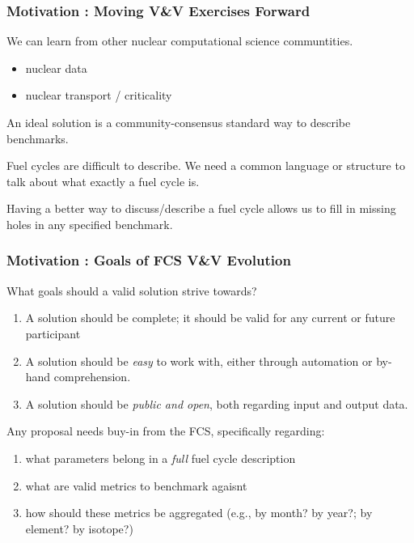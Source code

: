 \begin{frame}[ctb!]
  \frametitle{Motivation : Moving V\&V Exercises Forward}
  We can learn from other nuclear computational science communtities.
  \begin{itemize}
    \item nuclear data \cite{mattoon_generalized_2012}
    \item nuclear transport / criticality
  \end{itemize}

  An ideal solution is a community-consensus standard way to describe benchmarks.

  Fuel cycles are difficult to describe. We need a common language or structure
  to talk about what exactly a fuel cycle is.

  Having a better way to discuss/describe a fuel cycle allows us to fill in
  missing holes in any specified benchmark.
\end{frame}

\begin{frame}[ctb!]
  \frametitle{Motivation : Goals of FCS V\&V Evolution}
  What goals should a valid solution strive towards?
  \begin{enumerate}
    \item A solution should be complete; it should be valid for any current or
      future participant
    \item A solution should be \textit{easy} to work with, either through
      automation or by-hand comprehension.
    \item A solution should be \textit{public and open}, both regarding input
      and output data.
  \end{enumerate}

  Any proposal needs buy-in from the FCS, specifically regarding:
  \begin{enumerate}
    \item what parameters belong in a \textit{full} fuel cycle description
    \item what are valid metrics to benchmark agaisnt
    \item how should these metrics be aggregated (e.g., by month? by year?; by
      element? by isotope?)
  \end{enumerate}
\end{frame}
